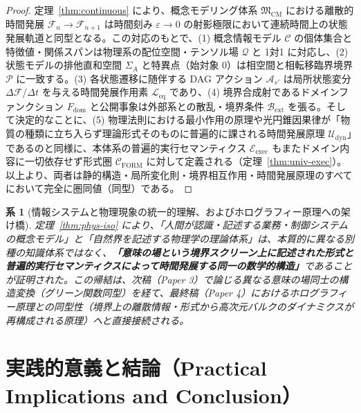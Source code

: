\documentclass[11pt,a4paper]{ltjsarticle}
\theoremstyle{definition}
\theoremstyle{plain}
\newtheorem{corollary}{系}[section]
\theoremstyle{remark}
\newcommand{\Cform}{\mathcal{C}_{\mathrm{FORM}}}
\begin{document}
\begin{proof}
定理~\ref{thm:continuous} により、概念モデリング体系 $\mathfrak{M}_{\mathrm{CM}}$ における離散的時間発展 $\mathcal{F}_n \to \mathcal{F}_{n+1}$ は時間刻み $\varepsilon \to 0$ の射影極限において連続時間上の状態発展軌道と同型となる。この対応のもとで、(1) 概念情報モデル $\mathcal{C}$ の個体集合と特徴値・関係スパンは物理系の配位空間・テンソル場 $\mathcal{Q}$ と 1対1 に対応し、(2) 状態モデルの排他直和空間 $\Sigma_A$ と特異点（始対象 $0$）は相空間と相転移臨界境界 $\mathcal{P}$ に一致する。(3) 各状態遷移に随伴する DAG アクション $\mathcal{A}_{s'}$ は局所状態変分 $\Delta \mathcal{F} / \Delta t$ を与える時間発展作用素 $\mathcal{L}_{\mathrm{eq}}$ であり、(4) 境界合成射であるドメインファンクション $F_{\mathrm{dom}}$ と公開事象は外部系との散乱・境界条件 $\mathcal{B}_{\mathrm{ext}}$ を張る。そして決定的なことに、(5) 物理法則における最小作用の原理や光円錐因果律が「物質の種類に立ち入らず理論形式そのものに普遍的に課される時間発展原理 $\mathcal{U}_{\mathrm{dyn}}$」であるのと同様に、本体系の普遍的実行セマンティクス $\mathcal{E}_{\mathrm{exec}}$ もまたドメイン内容に一切依存せず形式圏 $\Cform$ に対して定義される（定理~\ref{thm:univ-exec}）。以上より、両者は静的構造・局所変化則・境界相互作用・時間発展原理のすべてにおいて完全に圏同値（同型）である。
\end{proof}

\begin{corollary}[情報システムと物理現象の統一的理解、およびホログラフィー原理への架け橋]\label{cor:unified}
定理~\ref{thm:phys-iso} により、「人間が認識・記述する業務・制御システムの概念モデル」と「自然界を記述する物理学の理論体系」は、本質的に異なる別種の知識体系ではなく、\textbf{「意味の場という境界スクリーン上に記述された形式と普遍的実行セマンティクスによって時間発展する同一の数学的構造」}であることが証明された。この帰結は、次稿（Paper 3）で論じる異なる意味の場同士の構造変換（グリーン関数同型）を経て、最終稿（Paper 4）におけるホログラフィー原理との同型性（境界上の離散情報・形式から高次元バルクのダイナミクスが再構成される原理）へと直接接続される。
\end{corollary}
\section{実践的意義と結論（Practical Implications and Conclusion）}
\end{document}
